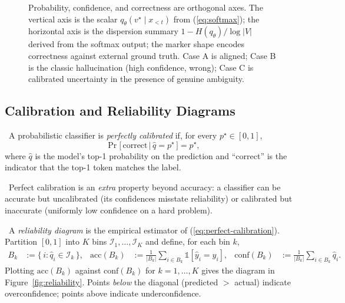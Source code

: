 \begin{figure}[H]
  \centering
  
  \caption{Probability, confidence, and correctness are orthogonal
           axes. The vertical axis is the scalar
           $q_\theta(v^\star \mid x_{<t})$ from (\ref{eq:softmax}); the
           horizontal axis is the dispersion summary
           $1 - H(q_\theta)/\log|V|$ derived from the softmax output;
           the marker shape encodes correctness against external
           ground truth. Case A is aligned; Case B is the classic
           hallucination (high confidence, wrong); Case C is
           calibrated uncertainty in the presence of genuine
           ambiguity.}
  \label{fig:prob_conf_corr}
\end{figure}

\subsection{Calibration and Reliability Diagrams}

\Def\ A probabilistic classifier is \emph{perfectly calibrated} if,
for every $p^\star \in [0, 1]$,
\begin{equation}
\Pr\!\big[\,\text{correct} \,\big|\, \hat q = p^\star\,\big] = p^\star,
\label{eq:perfect-calibration}
\end{equation}
where $\hat q$ is the model's top-1 probability on the prediction and
``correct'' is the indicator that the top-1 token matches the label.

\Ident\ Perfect calibration is an \emph{extra} property beyond
accuracy: a classifier can be accurate but uncalibrated (its
confidences misstate reliability) or calibrated but inaccurate
(uniformly low confidence on a hard problem).

\Def\ A \emph{reliability diagram} is the empirical estimator of
(\ref{eq:perfect-calibration}). Partition $[0,1]$ into $K$ bins
$\mathcal{I}_1, \ldots, \mathcal{I}_K$ and define, for each bin $k$,
\begin{align}
B_k &:= \{\, i : \hat q_i \in \mathcal{I}_k \,\}, &
\mathrm{acc}(B_k) &:= \frac{1}{|B_k|} \sum_{i \in B_k} \mathbb{1}[\hat y_i = y_i], &
\mathrm{conf}(B_k) &:= \frac{1}{|B_k|} \sum_{i \in B_k} \hat q_i.
\label{eq:bin-defs}
\end{align}
Plotting $\mathrm{acc}(B_k)$ against $\mathrm{conf}(B_k)$ for $k = 1,
\ldots, K$ gives the diagram in Figure~\ref{fig:reliability}. Points
\emph{below} the diagonal (predicted $>$ actual) indicate
overconfidence; points above indicate underconfidence.

